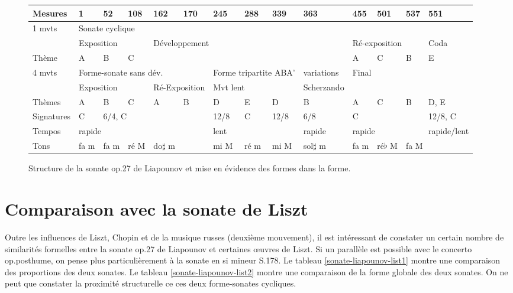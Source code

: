 \begin{figure}[!p]
  \begin{bigcenter}
    \vspace{-1cm}
     {
\begin{tabular}{|l|l|l|l|l|l|l|l|l|l|l|l|l|l|}
 \hline
   Mesures & 1 & 52 & 108 & 162 & 170 & 245 & 288 & 339 & 363 & 455 & 501 & 537 & 551 \\
 \hline
 \hline
   1 mvts & \multicolumn{13}{|l|}{Sonate cyclique}\\
 \hline
          & \multicolumn{3}{|l|}{Exposition} & \multicolumn{6}{l|}{Développement} & \multicolumn{3}{l|}{Ré-exposition} & Coda\\
 \hline
   Thème & A & B & C & \multicolumn{6}{l|}{} & A & C & B & E\\
 \hline
 \hline
   4 mvts & \multicolumn{5}{|l|}{Forme-sonate sans dév.} & \multicolumn{3}{|l|}{Forme tripartite ABA'} & variations & \multicolumn{4}{|l|}{Final}\\
 \hline
          & \multicolumn{3}{|l|}{Exposition} & \multicolumn{2}{l|}{Ré-Exposition} & \multicolumn{3}{l|}{Mvt lent} & Scherzando & \multicolumn{4}{l|}{}\\
 \hline
  Thèmes & A & B & C & A & B & D & E & D & B & A & C & B & D, E\\
 \hline
 \hline
  Signatures & C & \multicolumn{4}{|l|}{6/4, C} & 12/8 & C & 12/8 & 6/8 & \multicolumn{3}{|l|}{C} & 12/8, C\\
 \hline
  Tempos & \multicolumn{5}{|l|}{rapide} & \multicolumn{3}{|l|}{lent} & rapide & \multicolumn{3}{|l|}{rapide} & rapide/lent\\
 \hline
  Tons & fa m & fa m & ré M & \multicolumn{2}{|l|}{do$\sharp$ m} & mi M & ré m & mi M & sol$\sharp$ m & fa m & ré$\flat$ M & \multicolumn{2}{|l|}{fa M}\\
 \hline
\end{tabular}
    }
  \end{bigcenter}
  \caption{\label{structure}Structure de la sonate op.27 de Liapounov et mise en évidence des formes dans la forme.}
\end{figure}

\section{Comparaison avec la sonate de Liszt}

Outre les influences de Liszt, Chopin et de la musique russes (deuxième mouvement), il est intéressant de constater un certain nombre de similarités formelles entre la sonate op.27 de Liapounov et certaines œuvres de Liszt. Si un parallèle est possible avec le concerto op.posthume, on pense plus particulièrement à la sonate en si mineur S.178. Le tableau \ref{sonate-liapounov-list1} montre une comparaison des proportions des deux sonates. Le tableau \ref{sonate-liapounov-list2} montre une comparaison de la forme globale des deux sonates. On ne peut que constater la proximité structurelle ce ces deux forme-sonates cycliques.

